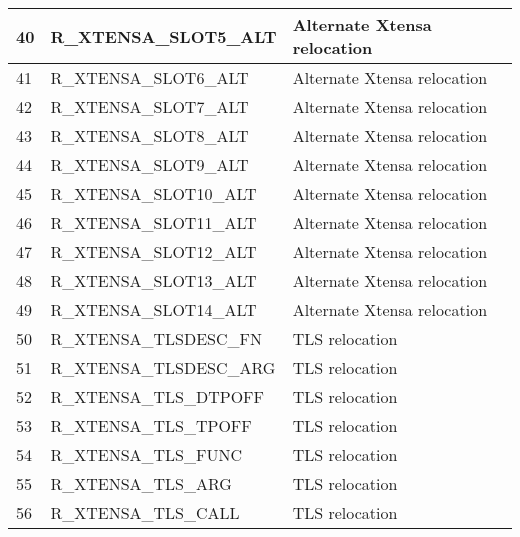 \begin{longtable}{|p{1cm}|p{6cm}|p{10cm}|}
	40 & R\_XTENSA\_SLOT5\_ALT & Alternate Xtensa relocation \\ \hline
	41 & R\_XTENSA\_SLOT6\_ALT & Alternate Xtensa relocation \\ \hline
	42 & R\_XTENSA\_SLOT7\_ALT & Alternate Xtensa relocation \\ \hline
	43 & R\_XTENSA\_SLOT8\_ALT & Alternate Xtensa relocation \\ \hline
	44 & R\_XTENSA\_SLOT9\_ALT & Alternate Xtensa relocation \\ \hline
	45 & R\_XTENSA\_SLOT10\_ALT & Alternate Xtensa relocation \\ \hline
	46 & R\_XTENSA\_SLOT11\_ALT & Alternate Xtensa relocation \\ \hline
	47 & R\_XTENSA\_SLOT12\_ALT & Alternate Xtensa relocation \\ \hline
	48 & R\_XTENSA\_SLOT13\_ALT & Alternate Xtensa relocation \\ \hline
	49 & R\_XTENSA\_SLOT14\_ALT & Alternate Xtensa relocation \\ \hline
	50 & R\_XTENSA\_TLSDESC\_FN & TLS relocation \\ \hline
	51 & R\_XTENSA\_TLSDESC\_ARG & TLS relocation \\ \hline
	52 & R\_XTENSA\_TLS\_DTPOFF & TLS relocation \\ \hline
	53 & R\_XTENSA\_TLS\_TPOFF & TLS relocation \\ \hline
	54 & R\_XTENSA\_TLS\_FUNC & TLS relocation \\ \hline
	55 & R\_XTENSA\_TLS\_ARG & TLS relocation \\ \hline
	56 & R\_XTENSA\_TLS\_CALL & TLS relocation \\ \hline
\end{longtable}